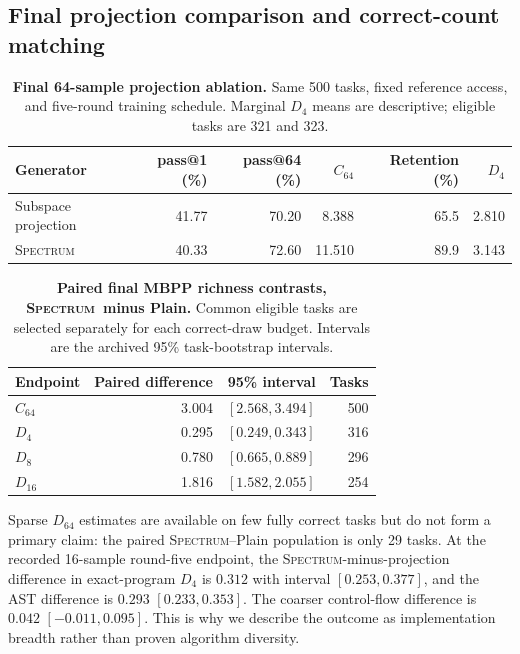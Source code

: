\documentclass{article}
\newcommand{\method}{\textsc{Spectrum}}
\begin{document}
\subsection{Final projection comparison and correct-count matching}
\begin{table}[htbp]
\centering\small
\caption{\textbf{Final 64-sample projection ablation.} Same 500 tasks, fixed reference access, and five-round training schedule. Marginal $D_4$ means are descriptive; eligible tasks are 321 and 323.}
\begin{tabular}{lrrrrr}
\toprule
Generator & pass@1 (\%) & pass@64 (\%) & $C_{64}$ & Retention (\%) & $D_4$\\
\midrule
Subspace projection &41.77&70.20&8.388&65.5&2.810\\
\method &40.33&72.60&11.510&89.9&3.143\\
\bottomrule
\end{tabular}
\end{table}

\begin{table}[htbp]
\centering\small
\caption{\textbf{Paired final MBPP richness contrasts, \method\ minus Plain.} Common eligible tasks are selected separately for each correct-draw budget. Intervals are the archived 95\% task-bootstrap intervals.}
\begin{tabular}{lrrr}
\toprule
Endpoint & Paired difference & 95\% interval & Tasks\\
\midrule
$C_{64}$ &3.004&$[2.568,3.494]$&500\\
$D_4$ &0.295&$[0.249,0.343]$&316\\
$D_8$ &0.780&$[0.665,0.889]$&296\\
$D_{16}$ &1.816&$[1.582,2.055]$&254\\
\bottomrule
\end{tabular}
\end{table}
Sparse $D_{64}$ estimates are available on few fully correct tasks but do not form a primary claim: the paired \method--Plain population is only 29 tasks. At the recorded 16-sample round-five endpoint, the \method-minus-projection difference in exact-program $D_4$ is $0.312$ with interval $[0.253,0.377]$, and the AST difference is $0.293$ $[0.233,0.353]$. The coarser control-flow difference is $0.042$ $[-0.011,0.095]$. This is why we describe the outcome as implementation breadth rather than proven algorithm diversity.
\end{document}
